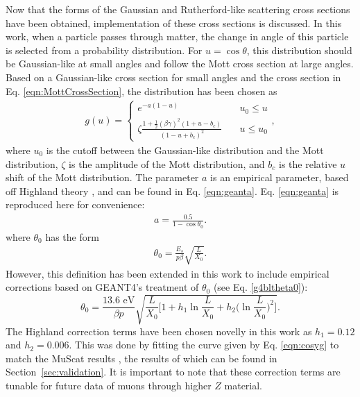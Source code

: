 \label{ssc:COSYScatteringImplementation} Now that the forms of the Gaussian and Rutherford-like scattering cross sections have been obtained, implementation of these cross sections is discussed. In this work, when a particle passes through matter, the change in angle of this particle is selected from a probability distribution. For $u=\cos\theta$, this distribution should be Gaussian-like at small angles \cite{gs} and follow the Mott cross section at large angles. Based on a Gaussian-like cross section for small angles and the cross section in Eq. \eqref{eqn:MottCrossSection}, the distribution has been chosen as
\begin{align}\label{eqn:cosyg}
g(u)=	\begin{cases}
	e^{-a(1-u)} & \quad u_0 \leq u \\
	\zeta\frac{1+\frac{1}{2}(\beta\gamma)^2(1+u-b_c)}{(1-u+b_c)^2} & \quad u\leq u_0
	\end{cases},
\end{align}
where $u_0$ is the cutoff between the Gaussian-like distribution and the Mott distribution, $\zeta$ is the amplitude of the Mott distribution, and $b_c$ is the relative $u$ shift of the Mott distribution. The parameter $a$ is an empirical parameter, based off Highland theory \cite{highland}, and can be found in Eq. \eqref{eqn:geanta}. Eq. \eqref{eqn:geanta} is reproduced here for convenience:
\begin{align*}
a=\frac{0.5}{1-\cos\theta_0}.
\end{align*}
where $\theta_0$ has the form \cite{highland} 
\begin{align*}
\theta_0 = \frac{E_s}{p\beta} \sqrt{\frac{L}{X_0}}.
\end{align*}
However, this definition has been extended in this work to include empirical corrections based on GEANT4's \cite{geant4} treatment of $\theta_0$ (see Eq. \eqref{g4bltheta0}):
\begin{equation}\label{eqn:cosytheta0}
\theta_0 = \frac{13.6 \text{ eV}}{\beta p} \sqrt{\frac{L}{X_0} \Big[ 1+h_1 \ln \frac{L}{X_0} + h_2 \Big(\ln \frac{L}{X_0}\Big)^2 \Big] }.
\end{equation}
The Highland correction terms have been chosen novelly in this work as $h_1=0.12$ and $h_2=0.006$. This was done by fitting the curve given by Eq. \eqref{eqn:cosyg} to match the MuScat results \cite{muscat}, the results of which can be found in Section~\ref{sec:validation}. It is important to note that these correction terms are tunable for future data of muons through higher $Z$ material.

